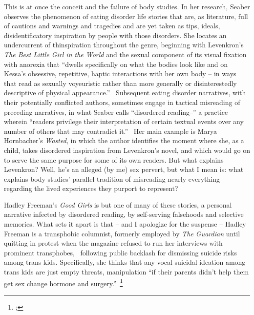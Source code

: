\documentclass[11pt]{article}
\begin{document}
    This is at once the conceit and the failure of body studies. In her research, Seaber observes the phenomenon of eating disorder life stories that are, as literature, full of cautions and warnings and tragedies and are yet taken as tips, ideals, disidentificatory inspiration by people with those disorders. She locates an undercurrent of thinspiration throughout the genre, beginning with Levenkron's \textit{The Best Little Girl in the World} and the sexual component of its visual fixation with anorexia that ``dwells specifically on what the bodies look like and on Kessa's obsessive, repetitive, haptic interactions with her own body -- in ways that read as sexually voyeuristic rather than more generally or disinterestedly descriptive of physical appearance.''~\autocite[60]{Seaber21} Subsequent eating disorder narratives, with their potentially conflicted authors, sometimes engage in tactical misreading of preceding narratives, in what Seaber calls ``disordered reading--'' a practice wherein ``readers privilege their interpretation of certain textual events over any number of others that may contradict it.''~\autocite[490]{Seaber17} Her main example is Marya Hornbacher's \textit{Wasted}, in which the author identifies the moment where she, as a child, takes disordered inspiration from Levenkron's novel, and which would go on to serve the same purpose for some of its own readers. But what explains Levenkron? Well, he's an alleged (by me) sex pervert, but what I mean is: what explains body studies' parallel tradition of misreading nearly everything regarding the lived experiences they purport to represent? 

    Hadley Freeman's \textit{Good Girls} is but one of many of these stories, a personal narrative infected by disordered reading, by self-serving falsehoods and selective memories. What sets it apart is that -- and I apologize for the suspense -- Hadley Freeman is a transphobic columnist, formerly employed by \textit{The Guardian} until quitting in protest when the magazine refused to run her interviews with prominent transphobes,~ following public backlash for dismissing suicide risks among trans kids. Specifically, she thinks that any vocal suicidal ideation among trans kids are just empty threats, manipulation ``if their parents didn't help them get sex change hormone and surgery.''~\footnote{; } 
    
\end{document}
